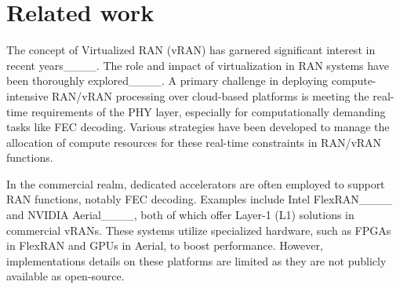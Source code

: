 \section{Related work}
\begin{table*}
  \caption{\\
  }
  \label{tab:related}
\end{table*}

The concept of Virtualized RAN (vRAN) has garnered significant interest in recent years____. The role and impact of virtualization in RAN systems have been thoroughly explored____. A primary challenge in deploying compute-intensive RAN/vRAN processing over cloud-based platforms is meeting the real-time requirements of the PHY layer, especially for computationally demanding tasks like FEC decoding. Various strategies have been developed to manage the allocation of compute resources for these real-time constraints in RAN/vRAN functions.

In the commercial realm, dedicated accelerators are often employed to support RAN functions, notably FEC decoding. Examples include Intel FlexRAN____ and NVIDIA Aerial____, both of which offer Layer-1 (L1) solutions in commercial vRANs. These systems utilize specialized hardware, such as FPGAs in FlexRAN and GPUs in Aerial, to boost performance. However, implementations details on these platforms are limited as they are not publicly available as open-source.


